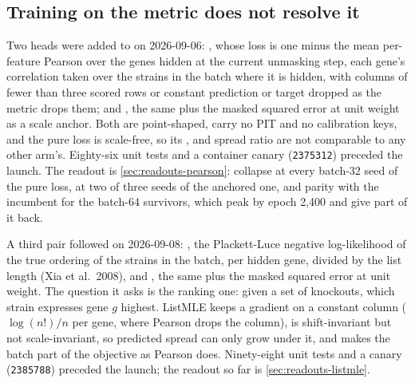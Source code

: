 

\subsection{Training on the metric does not resolve it}
\label{sec:findings-pearson}

Two heads were added to  on 2026-09-06:
, whose loss is one minus the mean per-feature Pearson over the genes hidden
at the current unmasking step, each gene's correlation taken over the strains in the batch
where it is hidden, with columns of fewer than three scored rows or constant prediction or
target dropped as the metric drops them; and , the same plus the masked
squared error at unit weight as a scale anchor. Both are point-shaped, carry no PIT and
no calibration keys, and the pure loss is scale-free, so its ,  and
spread ratio are not comparable to any other arm's. Eighty-six unit tests and a container
canary (\texttt{2375312}) preceded the launch. The readout is \cref{sec:readouts-pearson}:
collapse at every batch-32 seed of the pure loss, at two of three seeds of the anchored
one, and parity with the incumbent for the batch-64 survivors, which peak by epoch 2{,}400
and give part of it back.

A third pair followed on 2026-09-08: , the Plackett-Luce negative
log-likelihood of the true ordering of the strains in the batch, per hidden gene, divided
by the list length (Xia et al.\ 2008), and , the same plus the masked
squared error at unit weight. The question it asks is the ranking one: given a set of
knockouts, which strain expresses gene $g$ highest. ListMLE keeps a gradient on a constant
column ($\log(n!)/n$ per gene, where Pearson drops the column), is shift-invariant but not
scale-invariant, so predicted spread can only grow under it, and makes the batch part of
the objective as Pearson does. Ninety-eight unit tests and a canary (\texttt{2385788})
preceded the launch; the readout so far is \cref{sec:readouts-listmle}.
